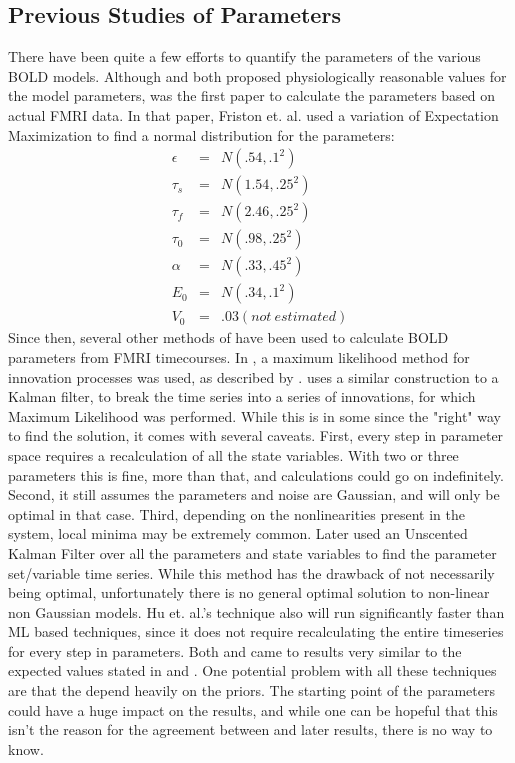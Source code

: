 \documentclass{article}
\begin{document}
\subsection{Previous Studies of Parameters}
There have been quite a few efforts to quantify the parameters of the
various BOLD models.  Although \cite{Buxton1998} and \cite{Friston2000}
both proposed physiologically reasonable values for the model parameters, 
\cite{Friston2002} was the first paper to calculate the parameters based 
on actual FMRI data. In that paper, Friston et. al. used a variation of
Expectation Maximization to find a normal distribution for the parameters:
\begin{eqnarray}
\epsilon &=& N(.54 , .1 ^2 )  \nonumber \\
\tau_s & =&  N(1.54, .25^2)   \nonumber \\
\tau_f & =&  N(2.46, .25^2)   \nonumber \\
\tau_0 & =&  N(.98 , .25^2 )   \nonumber \\
\alpha & =&  N(.33 , .45^2 )   \nonumber \\
E_0   & =&  N(.34 ,  .1 ^2 )   \nonumber \\
V_0  & = &  .03 (not\ estimated) \nonumber
\end{eqnarray}
Since then, several other methods of have been used to calculate
BOLD parameters from FMRI timecourses. In \cite{Riera2004}, a maximum
likelihood method for innovation processes was used, as described by
\cite{Ozaki1994}. \cite{Ozaki1994} uses a similar construction to a 
Kalman filter, to break the time series into a series of innovations,
for which Maximum Likelihood was performed. While this is in some since the
"right" way to find the solution, it comes with several caveats. First, every
step in parameter space requires a recalculation of all the state variables. With
two or three parameters this is fine, more than that, and calculations could go on
indefinitely. Second, it still assumes the parameters and noise are Gaussian, and
will only be optimal in that case. Third, depending on the nonlinearities present
in the system, local minima may be extremely common. Later \cite{Hu2009} used an 
Unscented Kalman Filter over all the parameters and state variables to find the 
parameter set/variable time series. While this method has the drawback of not necessarily
being optimal, unfortunately there is no general optimal solution to non-linear non
Gaussian models. Hu et. al.'s technique also will run significantly faster than
ML based techniques, since it does not require recalculating the entire timeseries
for every step in parameters. Both \cite{Hu2009} and \cite{Friston2002} came to results 
very similar to the expected values stated in \cite{Buxton1998} and \cite{Friston2000}.
One potential problem with all these techniques are that the depend heavily on the
priors. The starting point of the parameters could have a huge impact on the
results, and while one can be hopeful that this isn't the reason for the agreement
between \cite{Friston2000} and later results, there is no way to know. 
\end{document}
